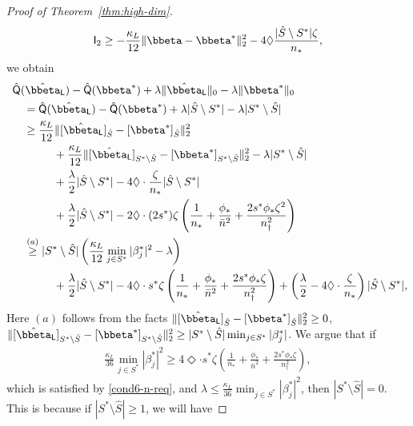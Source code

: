 \documentclass[10pt]{article}
\numberwithin{equation}{section}
\begin{document}
\begin{proof}[Proof of Theorem~\ref{thm:high-dim}]
\begin{align*}
    \mathsf{I}_2 \ge - \frac{\kappa_L}{12} \|\bbeta - \bbeta^*\|_2^2 - 4\Diamond \frac{|\hat{S} \setminus S^*| \zeta}{n_*},
\end{align*} we obtain
\begin{align*}
    &~\hat{\mathsf{Q}}(\hat{\bbeta}_{\mathsf{L}}) - \hat{\mathsf{Q}}(\bbeta^*) + \lambda \|\hat{\bbeta}_{\mathsf{L}}\|_0 - \lambda \|\bbeta^*\|_0 \\
    &~~~~ = \hat{\mathsf{Q}}(\hat{\bbeta}_{\mathsf{L}}) - \hat{\mathsf{Q}}(\bbeta^*) + \lambda |\hat{S} \setminus S^*| - \lambda |S^* \setminus \hat{S}| \\
    &~~~~\ge \frac{\kappa_L}{12} \|[\hat{\bbeta}_{\mathsf{L}}]_{\hat{S}} - [\bbeta^*]_{\hat{S}}\|_2^2 \\
    &~~~~~~~~~~~~ + \frac{\kappa_L}{12} \|[\hat{\bbeta}_{\mathsf{L}}]_{S^*\setminus \hat{S}} - [\bbeta^*]_{S^*\setminus \hat{S}}\|_2^2 - \lambda |S^* \setminus \hat{S}| \\
    &~~~~~~~~~~~~ + \frac{\lambda}{2} |\hat{S} \setminus S^*| - 4\Diamond \cdot \frac{\zeta}{n_*} |\hat{S}\setminus S^*| \\ 
    &~~~~~~~~~~~~ + \frac{\lambda}{2} |\hat{S}\setminus S^*| - 2 \Diamond \cdot (2s^*) \zeta \left(\frac{1}{n_*} + \frac{\phi_*}{\bar{n}^2} + \frac{2s^* \phi_* \zeta^2}{n_\dagger^2}\right) \\
    &~~~~ \overset{(a)}{\ge} |S^* \setminus \hat{S}| \left(\frac{\kappa_L}{12} \min_{j\in S^*}|\beta^*_j|^2 - \lambda \right) \\
    &~~~~~~~~~~~~ + \frac{\lambda}{2} |\hat{S}\setminus S^*| - 4 \Diamond \cdot s^* \zeta \left(\frac{1}{n_*} + \frac{\phi_*}{\bar{n}^2} + \frac{2s^* \phi_* \zeta}{n_\dagger^2}\right) + \left(\frac{\lambda}{2} - 4\Diamond \cdot \frac{\zeta}{n_*}\right) |\hat{S}\setminus S^*|,
\end{align*} 
Here $(a)$ follows from the facts $\|[\hat{\bbeta}_{\mathsf{L}}]_{\hat{S}} - [\bbeta^*]_{\hat{S}}\|_2^2 \ge 0$, $\|[\hat{\bbeta}_{\mathsf{L}}]_{S^*\setminus \hat{S}} - [\bbeta^*]_{S^*\setminus \hat{S}}\|_2^2 \ge |S^* \setminus \hat{S}| \min_{j\in S^*}|\beta^*_j|$. We argue that if
\begin{align}
\label{eq:proof-thm-highdim-n-req}
    \frac{\kappa_L}{36} \min_{j\in S^*} |\beta_j^*|^2 \ge  4 \Diamond \cdot s^* \zeta \left(\frac{1}{n_*} + \frac{\phi_*}{\bar{n}^2} + \frac{2s^* \phi_* \zeta}{n_\dagger^2}\right),
\end{align} which is satisfied by \cref{cond6-n-req}, and $\lambda \le \frac{\kappa_L}{36} \min_{j\in S^*} |\beta_j^*|^2$, then $|S^*\setminus \hat{S}|=0$. This is because if $|S^*\setminus \hat{S}| \ge 1$, we will have

\end{proof}
\end{document}
